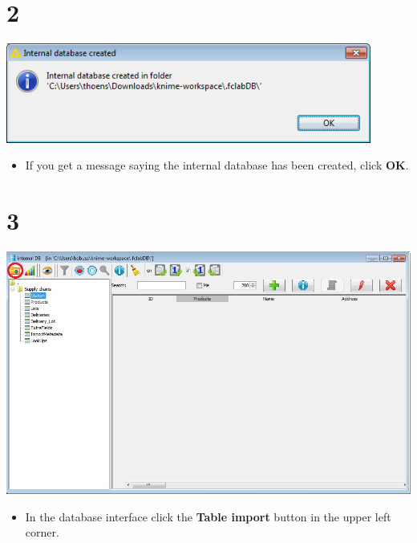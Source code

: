 \documentclass[10pt]{beamer}
\begin{document}
\section{2}
\begin{frame}
	\begin{center}
  		\includegraphics[width=0.9\textwidth]{2.png}
	\end{center}
	\begin{itemize}
		\item If you get a message saying the internal database has been created, click \textbf{OK}.
	\end{itemize}
\end{frame}

\section{3}
\begin{frame}
	\begin{center}
  		\includegraphics[height=0.6\textheight]{3.png}
	\end{center}
	\begin{itemize}
		\item In the database interface click the \textbf{Table import} button in the upper left corner.
	\end{itemize}
\end{frame}
\end{document}
